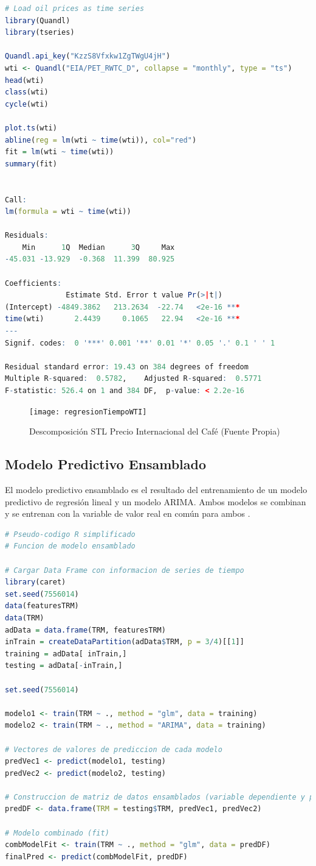 \begin{lstlisting}[language=R]
# Load oil prices as time series
library(Quandl)
library(tseries)

Quandl.api_key("KzzS8Vfxkw1ZgTWgU4jH")
wti <- Quandl("EIA/PET_RWTC_D", collapse = "monthly", type = "ts")
head(wti)
class(wti)
cycle(wti)

plot.ts(wti)
abline(reg = lm(wti ~ time(wti)), col="red")
fit = lm(wti ~ time(wti))
summary(fit)


Call:
lm(formula = wti ~ time(wti))

Residuals:
    Min      1Q  Median      3Q     Max
-45.031 -13.929  -0.368  11.399  80.925

Coefficients:
              Estimate Std. Error t value Pr(>|t|)
(Intercept) -4849.3862   213.2634  -22.74   <2e-16 ***
time(wti)       2.4439     0.1065   22.94   <2e-16 ***
---
Signif. codes:  0 '***' 0.001 '**' 0.01 '*' 0.05 '.' 0.1 ' ' 1

Residual standard error: 19.43 on 384 degrees of freedom
Multiple R-squared:  0.5782,	Adjusted R-squared:  0.5771
F-statistic: 526.4 on 1 and 384 DF,  p-value: < 2.2e-16
\end{lstlisting}

\begin{figure}[H]
	\centering
	\texttt{[image: regresionTiempoWTI]}\\
	\caption{Descomposición STL Precio Internacional del Café (Fuente Propia)}
\end{figure}

\subsection{Modelo Predictivo Ensamblado}
El modelo predictivo ensamblado es el resultado del entrenamiento de un modelo predictivo de regresión lineal y un modelo ARIMA. Ambos modelos se combinan y se entrenan con la variable de valor real en común para ambos \cite{viswanathan}.

\begin{lstlisting}[language=R]
# Pseudo-codigo R simplificado
# Funcion de modelo ensamblado

# Cargar Data Frame con informacion de series de tiempo
library(caret)
set.seed(7556014)
data(featuresTRM)
data(TRM)
adData = data.frame(TRM, featuresTRM)
inTrain = createDataPartition(adData$TRM, p = 3/4)[[1]]
training = adData[ inTrain,]
testing = adData[-inTrain,]

set.seed(7556014)

modelo1 <- train(TRM ~ ., method = "glm", data = training)
modelo2 <- train(TRM ~ ., method = "ARIMA", data = training)

# Vectores de valores de prediccion de cada modelo
predVec1 <- predict(modelo1, testing)
predVec2 <- predict(modelo2, testing)

# Construccion de matriz de datos ensamblados (variable dependiente y predictor)
predDF <- data.frame(TRM = testing$TRM, predVec1, predVec2)

# Modelo combinado (fit)
combModelFit <- train(TRM ~ ., method = "glm", data = predDF)
finalPred <- predict(combModelFit, predDF)
\end{lstlisting}

